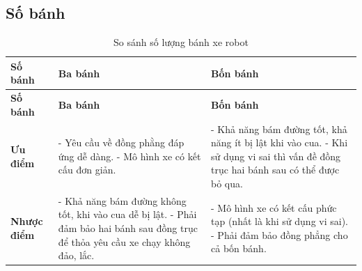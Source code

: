         \subsection{Số bánh}
            \begin{longtable}{|p{4cm}|p{5cm}|p{5cm}|}
                \caption{So sánh số lượng bánh xe robot} 
                \label{tab:compare_robot_wheels} \\ 
                \hline
                \textbf{Số bánh} & \textbf{Ba bánh} & \textbf{Bốn bánh} \\
                \hline
                \endfirsthead
                \hline
                \textbf{Số bánh} & \textbf{Ba bánh} & \textbf{Bốn bánh} \\
                \hline
                \endhead
                \hline
                \endfoot
                \hline
                \endlastfoot
                \textbf{Ưu điểm} &
                - Yêu cầu về đồng phằng đáp ứng dễ dàng. \newline
                - Mô hình xe có kết cấu đơn giản. &
                - Khả năng bám đường tốt, khả năng ít bị lật khi vào cua. \newline
                - Khi sử dụng vi sai thì vấn đề đồng trục hai bánh sau có thể được bỏ qua. \\
                \hline
                \textbf{Nhược điểm} &
                - Khả năng bám đường không tốt, khi vào cua dễ bị lật. \newline
                - Phải đảm bảo hai bánh sau đồng trục để thỏa yêu cầu xe chạy không đảo, lắc. &
                - Mô hình xe có kết cấu phức tạp (nhất là khi sử dụng vi sai). \newline 
                - Phải đảm bảo đồng phẳng cho cả bốn bánh. \\ 
            \end{longtable}
